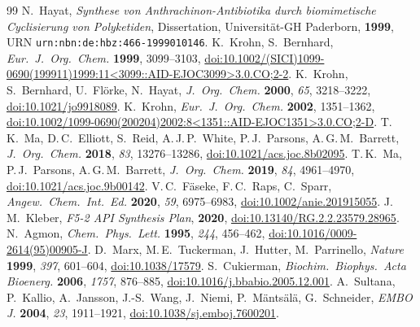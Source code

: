 \documentclass[11pt,a4paper]{article}
\begin{document}
\begin{thebibliography}{99}
 N.\ Hayat, \textit{Synthese von Anthrachinon-Antibiotika durch biomimetische Cyclisierung von Polyketiden}, Dissertation, Universit\"at-GH Paderborn, \textbf{1999}, URN \texttt{urn:nbn:de:hbz:466-1999010146}.
 K.\ Krohn, S.\ Bernhard, \textit{Eur.\ J.\ Org.\ Chem.} \textbf{1999}, 3099--3103, \href{https://doi.org/10.1002/(SICI)1099-0690(199911)1999:11<3099::AID-EJOC3099>3.0.CO;2-2}{doi:10.1002/(SICI)1099-0690(199911)1999:11<3099::AID-EJOC3099>3.0.CO;2-2}.
 K.\ Krohn, S.\ Bernhard, U.\ Fl\"orke, N.\ Hayat, \textit{J.\ Org.\ Chem.} \textbf{2000}, \textit{65}, 3218--3222, \href{https://doi.org/10.1021/jo9918089}{doi:10.1021/jo9918089}.
 K.\ Krohn, \textit{Eur.\ J.\ Org.\ Chem.} \textbf{2002}, 1351--1362, \href{https://doi.org/10.1002/1099-0690(200204)2002:8<1351::AID-EJOC1351>3.0.CO;2-D}{doi:10.1002/1099-0690(200204)2002:8<1351::AID-EJOC1351>3.0.CO;2-D}.
 T.\,K.\ Ma, D.\,C.\ Elliott, S.\ Reid, A.\,J.\,P.\ White, P.\,J.\ Parsons, A.\,G.\,M.\ Barrett, \textit{J.\ Org.\ Chem.} \textbf{2018}, \textit{83}, 13276--13286, \href{https://doi.org/10.1021/acs.joc.8b02095}{doi:10.1021/acs.joc.8b02095}.
 T.\,K.\ Ma, P.\,J.\ Parsons, A.\,G.\,M.\ Barrett, \textit{J.\ Org.\ Chem.} \textbf{2019}, \textit{84}, 4961--4970, \href{https://doi.org/10.1021/acs.joc.9b00142}{doi:10.1021/acs.joc.9b00142}.
 V.\,C.\ F\"aseke, F.\,C.\ Raps, C.\ Sparr, \textit{Angew.\ Chem.\ Int.\ Ed.} \textbf{2020}, \textit{59}, 6975--6983, \href{https://doi.org/10.1002/anie.201915055}{doi:10.1002/anie.201915055}.
 J.\,M.\ Kleber, \textit{F5-2 API Synthesis Plan}, \textbf{2020}, \href{https://doi.org/10.13140/RG.2.2.23579.28965}{doi:10.13140/RG.2.2.23579.28965}.
 N.\ Agmon, \textit{Chem.\ Phys.\ Lett.} \textbf{1995}, \textit{244}, 456--462, \href{https://doi.org/10.1016/0009-2614(95)00905-J}{doi:10.1016/0009-2614(95)00905-J}.
 D.\ Marx, M.\,E.\ Tuckerman, J.\ Hutter, M.\ Parrinello, \textit{Nature} \textbf{1999}, \textit{397}, 601--604, \href{https://doi.org/10.1038/17579}{doi:10.1038/17579}.
 S.\ Cukierman, \textit{Biochim.\ Biophys.\ Acta Bioenerg.} \textbf{2006}, \textit{1757}, 876--885, \href{https://doi.org/10.1016/j.bbabio.2005.12.001}{doi:10.1016/j.bbabio.2005.12.001}.
 A.\ Sultana, P.\ Kallio, A.\ Jansson, J.-S.\ Wang, J.\ Niemi, P.\ M\"ants\"al\"a, G.\ Schneider, \textit{EMBO J.} \textbf{2004}, \textit{23}, 1911--1921, \href{https://doi.org/10.1038/sj.emboj.7600201}{doi:10.1038/sj.emboj.7600201}.

\end{thebibliography}
\end{document}

